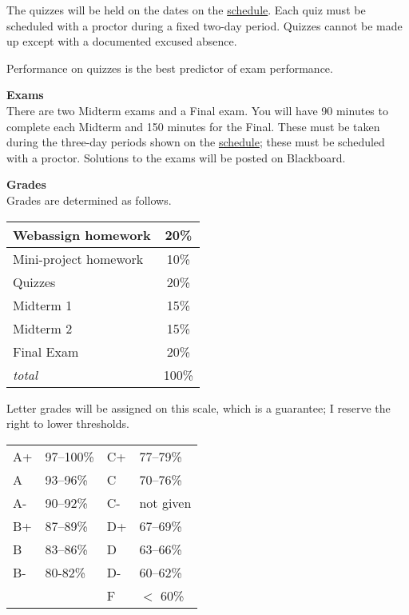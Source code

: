 \documentclass[12pt]{article}
\renewcommand{\emph}[1]{\textsf{\textbf{#1}}}
\newcommand{\localhead}[1]{\par\smallskip\textbf{#1}\nobreak\\}%
\def\heading#1{\localhead{\large\emph{#1}}}
\def\subheading#1{\localhead{\emph{#1}}}
\begin{document}
The quizzes will be held on the dates on the \href{https://bueler.github.io/math302/schedule.pdf}{schedule}.  Each quiz must be scheduled with a proctor during a fixed two-day period.  Quizzes cannot be made up except with a documented excused absence.

Performance on quizzes is the best predictor of exam performance.

\subheading{Exams}
There are two Midterm exams and a Final exam.  You will have 90 minutes to complete each Midterm and 150 minutes for the Final.  These must be taken during the three-day periods shown on the \href{https://bueler.github.io/math302/schedule.pdf}{schedule}; these must be scheduled with a proctor.  Solutions to the exams will be posted on Blackboard.


\heading{Grades}
Grades are determined as follows.
 
\begin{multicols}{2}

\begin{tabular}{|l|c|}
\hline
Webassign homework& 20\%\\
\hline
Mini-project homework & 10\% \\
\hline
Quizzes& 20\% \\
\hline
Midterm 1 & 15\% \\
\hline
Midterm 2 & 15\%  \\
\hline
Final Exam& 20\% \\
\hline
\textsl{total} & 100\%\\
\hline
\end{tabular}

\vskip 25pt

Letter grades will be assigned on this scale, which is a guarantee; I reserve the right to lower thresholds. 

\begin{tabular}{llll}
A+ & 97--100\% \quad\strut & C+ & 77--79\% \\
A & 93--96\% &  C & 70--76\% \\
A- & 90--92\% & C- & not given \\
B+ & 87--89\% & D+ & 67--69\% \\
B &  83--86\% & D & 63--66\% \\
B- & 80-82\% & D- & 60--62\% \\
 & & F  & $<$ 60\%
\end{tabular}
\end{multicols}


\vspace{-0.3in}
\end{document}
